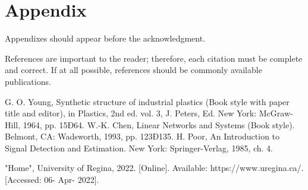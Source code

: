 \documentclass[letterpaper, 10 pt, conference]{ieeeconf}
\begin{document}
\section*{Appendix}

Appendixes should appear before the acknowledgment.



References are important to the reader; therefore, each citation must be complete and correct. If at all possible, references should be commonly available publications.



\begin{thebibliography}{99}

 G. O. Young, Synthetic structure of industrial plastics (Book style with paper title and editor), 	in Plastics, 2nd ed. vol. 3, J. Peters, Ed.  New York: McGraw-Hill, 1964, pp. 15Ð64.
 W.-K. Chen, Linear Networks and Systems (Book style).	Belmont, CA: Wadsworth, 1993, pp. 123Ð135.
 H. Poor, An Introduction to Signal Detection and Estimation.   New York: Springer-Verlag, 1985, ch. 4.

 "Home", University of Regina, 2022. [Online]. Available: https://www.uregina.ca/. [Accessed: 06- Apr- 2022].

\end{thebibliography}
\end{document}
